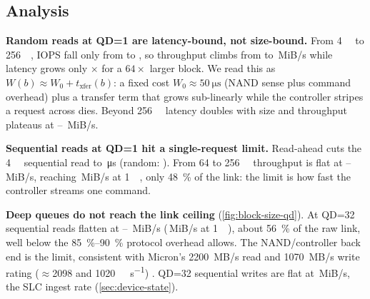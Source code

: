 \subsection{Analysis}
\textbf{Random reads at QD=1 are latency-bound, not size-bound.} From \qty{4}{\kibi\byte} to
\qty{256}{\kibi\byte}, IOPS fall only from
 to
, so throughput climbs from
 to
\,MiB/s while latency grows only
\csvget{}%
\csvget{}%
\ssdratio{\ssdA}{\ssdB}$\times$ for a $64\times$ larger block. We read this as
$W(b)\approx W_0 + t_\text{xfer}(b)$: a fixed cost $W_0\approx\qty{50}{\micro\second}$ (NAND sense plus
command overhead) plus a transfer term that grows sub-linearly while the controller stripes a request
across dies. Beyond \qty{256}{\kibi\byte} latency doubles with size and throughput plateaus at
--%
\,MiB/s.

\textbf{Sequential reads at QD=1 hit a single-request limit.} Read-ahead cuts the \qty{4}{\kibi\byte}
sequential read to \,\si{\micro\second}
(random: ). From 64 to
\qty{256}{\kibi\byte} throughput is flat at
--%
\,MiB/s, reaching
\,MiB/s at \qty{1}{\mebi\byte},
only \qty{48}{\percent} of the link: the limit is how fast the controller streams one command.

\textbf{Deep queues do not reach the link ceiling} (\cref{fig:block-size-qd}). At QD=32 sequential reads
flatten at --%
\,MiB/s
(\,MiB/s at \qty{1}{\mebi\byte}),
about \qty{56}{\percent} of the raw link, well below the \qtyrange{85}{90}{\percent} protocol overhead
allows. The NAND/controller back end is the limit, consistent with Micron's \qty{2200}{MB/s} read and
\qty{1070}{MB/s} write rating (\ensuremath{\approx}\num{2098} and \qty{1020}{\mebi\byte\per\second})
\cite{micron2210brief}. QD=32 sequential writes are flat at
\,MiB/s, the SLC ingest rate
(\cref{sec:device-state}).

